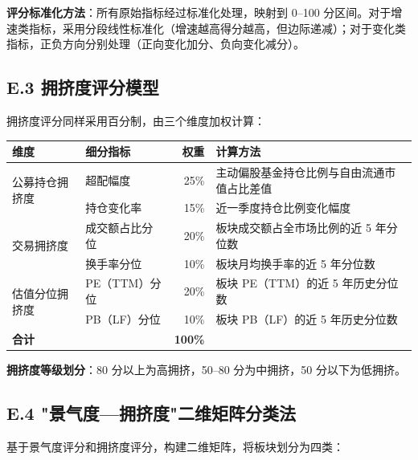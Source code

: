 \vspace{0.3em}

\textbf{评分标准化方法}：所有原始指标经过标准化处理，映射到 0--100 分区间。对于增速类指标，采用分段线性标准化（增速越高得分越高，但边际递减）；对于变化类指标，正负方向分别处理（正向变化加分、负向变化减分）。

\subsection{E.3 拥挤度评分模型}

拥挤度评分同样采用百分制，由三个维度加权计算：

\begin{exhibitbox}[表 E-2：拥挤度评分体系及权重]
\centering
\small
\renewcommand{\arraystretch}{1.2}
\begin{tabularx}{\textwidth}{@{}l l r X@{}}
\toprule
\textbf{维度} & \textbf{细分指标} & \textbf{权重} & \textbf{计算方法} \\
\midrule
\multirow{2}{*}{公募持仓拥挤度} & 超配幅度 & 25\% & 主动偏股基金持仓比例与自由流通市值占比差值 \\
& 持仓变化率 & 15\% & 近一季度持仓比例变化幅度 \\
\cmidrule(lr){2-4}
\multirow{2}{*}{交易拥挤度} & 成交额占比分位 & 20\% & 板块成交额占全市场比例的近 5 年分位数 \\
& 换手率分位 & 10\% & 板块月均换手率的近 5 年分位数 \\
\cmidrule(lr){2-4}
\multirow{2}{*}{估值分位拥挤度} & PE（TTM）分位 & 20\% & 板块 PE（TTM）的近 5 年历史分位数 \\
& PB（LF）分位 & 10\% & 板块 PB（LF）的近 5 年历史分位数 \\
\midrule
\textbf{合计} & & \textbf{100\%} & \\
\bottomrule
\end{tabularx}
\vspace{0.5em}
\end{exhibitbox}

\vspace{0.3em}

\textbf{拥挤度等级划分}：80 分以上为高拥挤，50--80 分为中拥挤，50 分以下为低拥挤。

\subsection{E.4 "景气度---拥挤度"二维矩阵分类法}

基于景气度评分和拥挤度评分，构建二维矩阵，将板块划分为四类：

